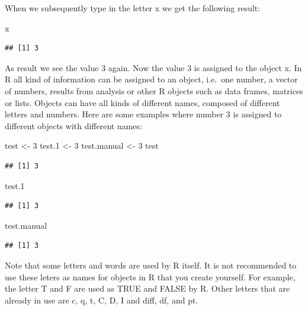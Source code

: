 \documentclass[]{book}
\newenvironment{Shaded}{\begin{snugshade}}{\end{snugshade}}
\newcommand{\DecValTok}[1]{\textcolor[rgb]{0.00,0.00,0.81}{#1}}
\newcommand{\StringTok}[1]{\textcolor[rgb]{0.31,0.60,0.02}{#1}}
\newcommand{\NormalTok}[1]{#1}
\theoremstyle{definition}
\theoremstyle{definition}
\theoremstyle{definition}
\theoremstyle{remark}
\begin{document}
When we subsequently type in the letter x we get the following result:

\begin{Shaded}
\begin{Highlighting}[]
\NormalTok{x }
\end{Highlighting}
\end{Shaded}

\begin{verbatim}
## [1] 3
\end{verbatim}

As result we see the value 3 again. Now the value 3 is assigned to the
object x. In R all kind of information can be assigned to an object,
i.e.~one number, a vector of numbers, results from analysis or other R
objects such as data frames, matrices or lists. Objects can have all
kinds of different names, composed of different letters and numbers.
Here are some examples where number 3 is assigned to different objects
with different names:

\begin{Shaded}
\begin{Highlighting}[]
\NormalTok{test <-}\StringTok{ }\DecValTok{3}
\NormalTok{test.}\DecValTok{1}\NormalTok{ <-}\StringTok{ }\DecValTok{3}
\NormalTok{test.manual <-}\StringTok{ }\DecValTok{3}
\NormalTok{test}
\end{Highlighting}
\end{Shaded}

\begin{verbatim}
## [1] 3
\end{verbatim}

\begin{Shaded}
\begin{Highlighting}[]
\NormalTok{test.}\DecValTok{1}
\end{Highlighting}
\end{Shaded}

\begin{verbatim}
## [1] 3
\end{verbatim}

\begin{Shaded}
\begin{Highlighting}[]
\NormalTok{test.manual }
\end{Highlighting}
\end{Shaded}

\begin{verbatim}
## [1] 3
\end{verbatim}

Note that some letters and words are used by R itself. It is not
recommended to use these leters as names for objects in R that you
create yourself. For example, the letter T and F are used as TRUE and
FALSE by R. Other letters that are already in use are c, q, t, C, D, I
and diff, df, and pt.
\end{document}
